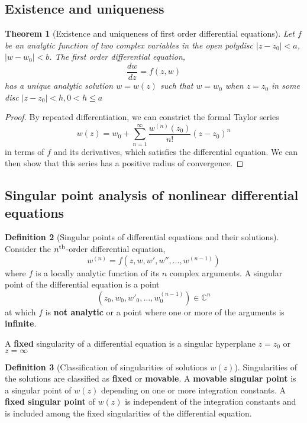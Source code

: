 \documentclass[10pt, oneside, reqno]{amsart}
\theoremstyle{plain}%
\newtheorem{thm}{Theorem}[section]
\theoremstyle{definition}
\newtheorem{defn}[thm]{Definition}
\theoremstyle{remark}
\newcommand{\C}{\mathbb{C}}
\newcommand{\nth}{n\textsuperscript{th}}
\begin{document}
\subsection{Existence and uniqueness} %
\label{sec:existence_and_uniqueness}


\begin{thm}[Existence and uniqueness of first order differential equations]
	Let $f$ be an analytic function of two complex variables in the open polydisc $|z - z_0| < a$, $|w - w_0| < b$.
	The first order differential equation,
	\[
		\frac{dw}{dz} = f(z,w)
	\] has a unique analytic solution $w = w(z)$ such that $w = w_0$ when $ z = z_0$ in some disc $|z - z_0| < h, 0 < h \leq a$
\end{thm}

\begin{proof}
	By repeated differentiation, we can constrict the formal Taylor series \[
		w(z) = w_0 + \sum_{n=1}^\infty \frac{w^{(n)}(z_0)}{n!} (z - z_0)^n
	\] in terms of $f$ and its derivatives, which satisfies the differential equation.  We can then show that this series has a positive radius of convergence.
\end{proof}


\subsection{Singular point analysis of nonlinear differential equations} %
\label{sec:singular_point_analysis_of_nonlinear_differential_equations}

\begin{defn}[Singular points of differential equations and their solutions]
	Consider the $\nth$-order differential equation,\[
		w^{(n)} = f(z, w, w', w'', \dots, w^{(n-1)})
	\] where $f$ is a locally analytic function of its $n$ complex arguments.  A singular point of the differential equation is a point \[
		(z_0, w_0, w'_0, \dots, w_0^{(n-1)}) \in \C^n
	\]
	at which $f$ is \textbf{not analytic} or a point where one or more of the arguments is \textbf{infinite}.
	
	A \textbf{fixed} singularity of a differential equation is a singular hyperplane $z = z_0$ or $z = \infty$
\end{defn}

\begin{defn}[Classification of singularities of solutions $w(z)$]
	Singularities of the solutions are classified as \textbf{fixed} or \textbf{movable}.  A \textbf{movable singular point} is a singular point of $w(z)$ depending on one or more integration constants. 
	A \textbf{fixed singular point} of $w(z)$ is independent of the integration constants and is included among the fixed singularities of the differential equation.
\end{defn}
	
\end{document}
